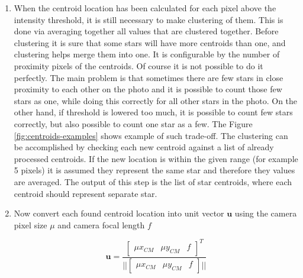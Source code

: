 \documentclass[12pt,a4paper,twoside]{article}
\begin{document}
\begin{enumerate}
\item When the centroid location has been calculated for each pixel above the intensity threshold, it is still necessary to make clustering of them. This is done via averaging together all values that are clustered together. Before clustering it is sure that some stars will have more centroids than one, and clustering helps merge them into one. It is configurable by the number of proximity pixels of the centroids. Of course it is not possible to do it perfectly. The main problem is that sometimes there are few stars in close proximity to each other on the photo and it is possible to count those few stars as one, while doing this correctly for all other stars in the photo. On the other hand, if threshold is lowered too much, it is possible to count few stars correctly, but also possible to count one star as a few. The Figure \ref{fig:centroids-examples} shows example of such trade-off.
The clustering can be accomplished by checking each new centroid against a list of already processed centroids. If the new location is within the given range (for example 5 pixels) it is assumed they represent the same star and therefore they values are averaged. The output of this step is the list of star centroids, where each centroid should represent separate star.


\item Now convert each found centroid location into unit vector $\bm{u}$ using the camera pixel size $\mu$ and camera focal length $f$

\begin{equation}
\bm{u} = \frac{
\begin{bmatrix}
\mu x_{CM} & \mu y_{CM} & f
\end{bmatrix}
^T}
{||
\begin{bmatrix}
\mu x_{CM} & \mu y_{CM} & f
\end{bmatrix}
||}
\end{equation}
\end{enumerate}
\end{document}
